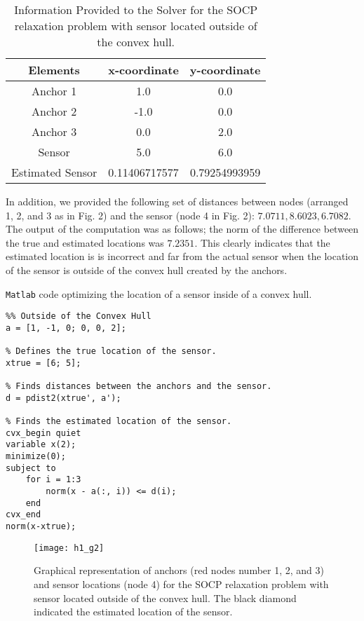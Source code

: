 \documentclass[12pt,letterpaper]{article}
\begin{document}
\begin{table}[h]
\begin{center}
\caption{Information Provided to the Solver for the SOCP relaxation problem with sensor located outside of the convex hull.}
\vspace{.3cm}
\label{my-label}
\begin{tabular}{|c|c|c|}
\hline
        Elements  & x-coordinate & y-coordinate \\ \hline
               Anchor 1  &  1.0 &  0.0\\ 
       Anchor 2  &  -1.0 &  0.0\\ 
       Anchor 3  &  0.0 &  2.0\\ 
       Sensor  &  5.0 &  6.0 \\ 
       Estimated Sensor  &  0.11406717577&  0.79254993959\\ \hline

\hline
\end{tabular}
\end{center}
\end{table}
In addition, we provided the following set of distances between nodes (arranged 1, 2, and 3 as in Fig. 2) and the sensor (node 4 in Fig. 2): $7.0711, 8.6023, 6.7082$. The output of the computation was as follows; the norm of the difference between the true and estimated locations was $7.2351$. This clearly indicates that the estimated location is is incorrect and far from the actual sensor when the location of the sensor is outside of the convex hull created by the anchors. 


\begin{center}
\texttt{Matlab} code optimizing the location of a sensor inside of a convex hull.  
\end{center}
\begin{lstlisting}
%% Outside of the Convex Hull
a = [1, -1, 0; 0, 0, 2];

% Defines the true location of the sensor.
xtrue = [6; 5]; 

% Finds distances between the anchors and the sensor.
d = pdist2(xtrue', a');

% Finds the estimated location of the sensor.
cvx_begin quiet
variable x(2);
minimize(0);
subject to
    for i = 1:3
        norm(x - a(:, i)) <= d(i);
    end
cvx_end
norm(x-xtrue);
\end{lstlisting}


\begin{figure}[h]
\begin{center}
\texttt{[image: h1\_g2]}
\end{center}
\caption{Graphical representation of anchors (red nodes number 1, 2, and 3) and sensor locations (node 4) for the SOCP relaxation problem with sensor located outside of the convex hull. The black diamond indicated the estimated location of the sensor.}
\end{figure}
\end{document}
